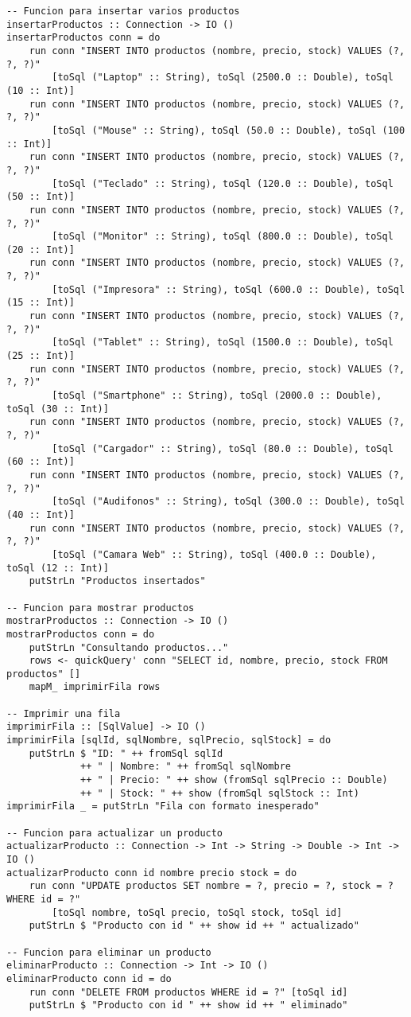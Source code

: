 \documentclass[12pt]{article}
\begin{document}
\begin{lstlisting}[style=haskell, caption=Main.hs (programa completo)]
-- Funcion para insertar varios productos
insertarProductos :: Connection -> IO ()
insertarProductos conn = do
    run conn "INSERT INTO productos (nombre, precio, stock) VALUES (?, ?, ?)"
        [toSql ("Laptop" :: String), toSql (2500.0 :: Double), toSql (10 :: Int)]
    run conn "INSERT INTO productos (nombre, precio, stock) VALUES (?, ?, ?)"
        [toSql ("Mouse" :: String), toSql (50.0 :: Double), toSql (100 :: Int)]
    run conn "INSERT INTO productos (nombre, precio, stock) VALUES (?, ?, ?)"
        [toSql ("Teclado" :: String), toSql (120.0 :: Double), toSql (50 :: Int)]
    run conn "INSERT INTO productos (nombre, precio, stock) VALUES (?, ?, ?)"
        [toSql ("Monitor" :: String), toSql (800.0 :: Double), toSql (20 :: Int)]
    run conn "INSERT INTO productos (nombre, precio, stock) VALUES (?, ?, ?)"
        [toSql ("Impresora" :: String), toSql (600.0 :: Double), toSql (15 :: Int)]
    run conn "INSERT INTO productos (nombre, precio, stock) VALUES (?, ?, ?)"
        [toSql ("Tablet" :: String), toSql (1500.0 :: Double), toSql (25 :: Int)]
    run conn "INSERT INTO productos (nombre, precio, stock) VALUES (?, ?, ?)"
        [toSql ("Smartphone" :: String), toSql (2000.0 :: Double), toSql (30 :: Int)]
    run conn "INSERT INTO productos (nombre, precio, stock) VALUES (?, ?, ?)"
        [toSql ("Cargador" :: String), toSql (80.0 :: Double), toSql (60 :: Int)]
    run conn "INSERT INTO productos (nombre, precio, stock) VALUES (?, ?, ?)"
        [toSql ("Audifonos" :: String), toSql (300.0 :: Double), toSql (40 :: Int)]
    run conn "INSERT INTO productos (nombre, precio, stock) VALUES (?, ?, ?)"
        [toSql ("Camara Web" :: String), toSql (400.0 :: Double), toSql (12 :: Int)]
    putStrLn "Productos insertados"

-- Funcion para mostrar productos
mostrarProductos :: Connection -> IO ()
mostrarProductos conn = do
    putStrLn "Consultando productos..."
    rows <- quickQuery' conn "SELECT id, nombre, precio, stock FROM productos" []
    mapM_ imprimirFila rows

-- Imprimir una fila
imprimirFila :: [SqlValue] -> IO ()
imprimirFila [sqlId, sqlNombre, sqlPrecio, sqlStock] = do
    putStrLn $ "ID: " ++ fromSql sqlId
             ++ " | Nombre: " ++ fromSql sqlNombre
             ++ " | Precio: " ++ show (fromSql sqlPrecio :: Double)
             ++ " | Stock: " ++ show (fromSql sqlStock :: Int)
imprimirFila _ = putStrLn "Fila con formato inesperado"

-- Funcion para actualizar un producto
actualizarProducto :: Connection -> Int -> String -> Double -> Int -> IO ()
actualizarProducto conn id nombre precio stock = do
    run conn "UPDATE productos SET nombre = ?, precio = ?, stock = ? WHERE id = ?"
        [toSql nombre, toSql precio, toSql stock, toSql id]
    putStrLn $ "Producto con id " ++ show id ++ " actualizado"

-- Funcion para eliminar un producto
eliminarProducto :: Connection -> Int -> IO ()
eliminarProducto conn id = do
    run conn "DELETE FROM productos WHERE id = ?" [toSql id]
    putStrLn $ "Producto con id " ++ show id ++ " eliminado"
\end{lstlisting}
\end{document}
